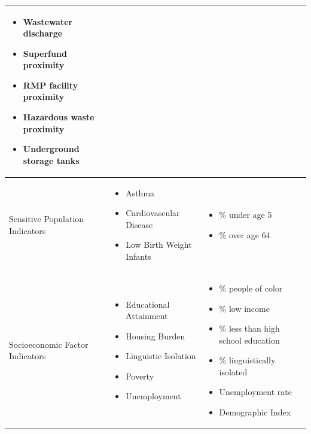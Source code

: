 \begin{table}
\begin{tabular}{L{0.2\textwidth} L{0.35\textwidth} L{0.35\textwidth}}
        \begin{itemize}[noitemsep, topsep=0pt]
            \item Wastewater discharge
            \item Superfund proximity
            \item RMP facility proximity
            \item Hazardous waste proximity
            \item Underground storage tanks
        \end{itemize} \\
        \hline
        Sensitive Population Indicators & 
        \begin{itemize}[noitemsep, topsep=0pt]
            \item Asthma
            \item Cardiovascular Disease
            \item Low Birth Weight Infants
        \end{itemize} & 
        \begin{itemize}[noitemsep, topsep=0pt]
            \item \% under age 5
            \item \% over age 64
        \end{itemize} \\
        \hline 
        Socioeconomic Factor Indicators & 
        \begin{itemize}[noitemsep, topsep=0pt]
            \item Educational Attainment
            \item Housing Burden
            \item Linguistic Isolation
            \item Poverty
            \item Unemployment
        \end{itemize} & 
        \begin{itemize}[noitemsep, topsep=0pt]
            \item \% people of color
            \item \% low income
            \item \% less than high school education
            \item \% linguistically isolated
            \item Unemployment rate
            \item Demographic Index
        \end{itemize} \\
        \hline
    \end{tabular}
    \vspace{1em}
\end{table}
